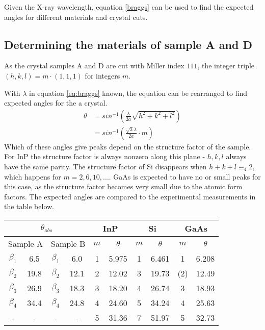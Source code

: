 \documentclass[a4paper,twoside=false,abstract=false,numbers=noenddot,
titlepage=false,headings=small,parskip=half,version=last]{scrartcl}
\begin{document}
Given the X-ray wavelength, equation \eqref{braggs} can be used to find the expected angles for different materials and crystal cuts.

\subsection{Determining the materials of sample A and D}

As the crystal samples A and D are cut with Miller index $111$,
the integer triple $(h,k,l)=m\cdot (1,1,1)$ for integers $m$.

With $\lambda$ in equation \eqref{eq:braggs} known, the equation can be rearranged to find expected angles for the a crystal.
\begin{align}
\label{eq:braggangle}
\theta&=sin^{-1}\left( \frac{\lambda}{2a} \sqrt{h^2+k^2+l^2}\right)\\
&=sin^{-1}\left( \frac{\sqrt{3}\lambda}{2a} \cdot m\right)\nonumber
\end{align}
Which of these angles give peaks depend on the structure factor of the sample.
For InP the structure factor is always nonzero along this plane - $h,k,l$ always have the same parity.
The structure factor of Si disappears when $h+k+l\equiv_4 2$, which happens for $m=2,6,10,...$.
GaAs is expected to have no or small peaks for this case, as the structure factor becomes very small due to the atomic form factors.
The expected angles are compared to the experimental measurements in the table below.

\begin{tabular}{ |c|c|c|c|c|c|c|c|c|c| }
    \hline
    \multicolumn{4}{|c|}{$\theta_{obs}$}
	& \multicolumn{2}{|c|}{InP}
	& \multicolumn{2}{|c|}{Si}
	& \multicolumn{2}{|c|}{GaAs}\\
    \hline
	\multicolumn{2}{|c|}{Sample A} & \multicolumn{2}{|c|}{Sample B} & $m$ & $\theta$ & $m$ & $\theta$ & $m$ & $\theta$ \\
	\hline
    $\beta_1$	& 6.5\degree	& $\beta_1$	& 6.0\degree	& 1 & 5.975\degree & 1	& 6.461\degree &  1		& 6.208\degree	\\
    $\beta_2$	& 19.8\degree	& $\beta_2$	& 12.1\degree	& 2 & 12.02\degree & 3	& 19.73\degree & (2)	& 12.49\degree	\\
    $\beta_3$	& 26.9\degree	& $\beta_3$	& 18.3\degree	& 3 & 18.20\degree & 4	& 26.74\degree &  3		& 18.93\degree	\\
    $\beta_4$	& 34.4\degree	& $\beta_4$	& 24.8\degree	& 4 & 24.60\degree & 5	& 34.24\degree &  4		& 25.63\degree	\\
    -			& -				& -			& -				& 5 & 31.36\degree & 7	& 51.97\degree &  5		& 32.73\degree	\\
	\hline
\end{tabular}
\end{document}

